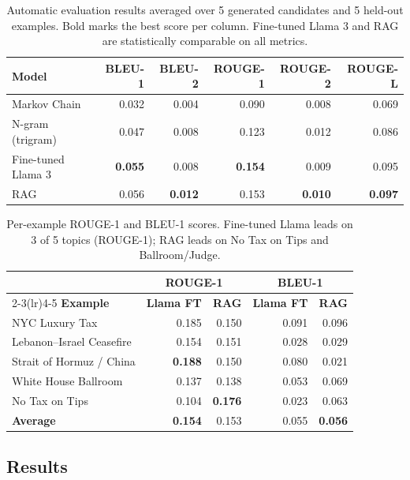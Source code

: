 \documentclass[11pt,a4paper]{article}
\begin{document}
\begin{table}[H]
\centering
\caption{Automatic evaluation results averaged over 5 generated candidates and 5 held-out examples. Bold marks the best score per column. Fine-tuned Llama 3 and RAG are statistically comparable on all metrics.}
\label{tab:results}
\begin{tabular}{lrrrrr}
\toprule
\textbf{Model} & \textbf{BLEU-1} & \textbf{BLEU-2} & \textbf{ROUGE-1} & \textbf{ROUGE-2} & \textbf{ROUGE-L} \\
\midrule
Markov Chain        & 0.032 & 0.004 & 0.090 & 0.008 & 0.069 \\
N-gram (trigram)    & 0.047 & 0.008 & 0.123 & 0.012 & 0.086 \\
Fine-tuned Llama 3  & \textbf{0.055} & 0.008 & \textbf{0.154} & 0.009 & 0.095 \\
RAG                 & 0.056 & \textbf{0.012} & 0.153 & \textbf{0.010} & \textbf{0.097} \\
\bottomrule
\end{tabular}
\end{table}

\begin{table}[H]
\centering
\caption{Per-example ROUGE-1 and BLEU-1 scores. Fine-tuned Llama leads on 3 of 5 topics (ROUGE-1); RAG leads on No Tax on Tips and Ballroom/Judge.}
\label{tab:perexample}
\begin{tabular}{lrrrr}
\toprule
 & \multicolumn{2}{c}{\textbf{ROUGE-1}} & \multicolumn{2}{c}{\textbf{BLEU-1}} \\
\cmidrule(lr){2-3}\cmidrule(lr){4-5}
\textbf{Example} & \textbf{Llama FT} & \textbf{RAG} & \textbf{Llama FT} & \textbf{RAG} \\
\midrule
NYC Luxury Tax          & 0.185 & 0.150 & 0.091 & 0.096 \\
Lebanon--Israel Ceasefire & 0.154 & 0.151 & 0.028 & 0.029 \\
Strait of Hormuz / China & \textbf{0.188} & 0.150 & 0.080 & 0.021 \\
White House Ballroom     & 0.137 & 0.138 & 0.053 & 0.069 \\
No Tax on Tips           & 0.104 & \textbf{0.176} & 0.023 & 0.063 \\
\midrule
\textbf{Average}         & \textbf{0.154} & 0.153 & 0.055 & \textbf{0.056} \\
\bottomrule
\end{tabular}
\end{table}

\subsection{Results}
\end{document}
